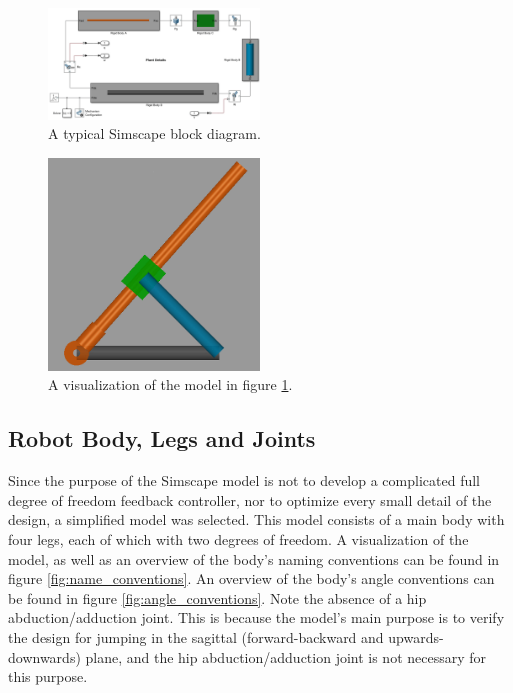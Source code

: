\begin{figure}
    \centering
    \includegraphics[width=0.5\textwidth]{Images/simscape_tutorial_diagram.png}
    \caption{A typical Simscape block diagram.}
    \label{fig:simscape_tutorial_diagram}
\end{figure}
\begin{figure}
    \centering
    \includegraphics[width=0.5\textwidth]{Images/simscape_tutorial_visualization.png}
    \caption{A visualization of the model in figure \ref{fig:simscape_tutorial_diagram}.}
    \label{fig:simscape_tutorial_visualization}
\end{figure}

\subsection{Robot Body, Legs and Joints}
\label{sec:robot_main_parts}

Since the purpose of the Simscape model is not to develop a complicated full degree of freedom feedback controller, nor to optimize every small detail of the design, a simplified model was selected. This model consists of a main body with four legs, each of which with two degrees of freedom. A visualization of the model, as well as an overview of the body's naming conventions can be found in figure \ref{fig:name_conventions}. An overview of the body's angle conventions can be found in figure \ref{fig:angle_conventions}. Note the absence of a hip abduction/adduction joint. This is because the model's main purpose is to verify the design for jumping in the sagittal (forward-backward and upwards-downwards) plane, and the hip abduction/adduction joint is not necessary for this purpose.

